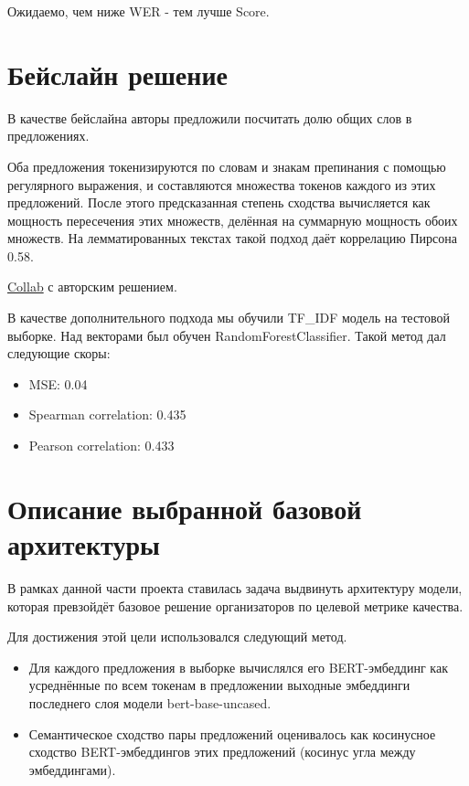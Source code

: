 \documentclass[12pt]{article}
\begin{document}
Ожидаемо, чем ниже WER - тем лучше Score.
\newpage

\section{Бейслайн решение}

В качестве бейслайна авторы предложили посчитать долю общих слов в предложениях.

Оба предложения токенизируются по словам и знакам препинания с помощью регулярного выражения, и составляются множества токенов каждого из этих предложений. После этого предсказанная степень сходства вычисляется как мощность пересечения этих множеств, делённая на суммарную мощность обоих множеств.
На лемматированных текстах такой подход даёт коррелацию Пирсона 0.58.

\href{https://github.com/semantic-textual-relatedness/Semantic_Relatedness_SemEval2024/blob/main/STR_Baseline.ipynb}{Collab} с авторским решением.

В качестве дополнительного подхода мы обучили TF\_IDF модель на тестовой выборке. Над векторами был обучен RandomForestClassifier. Такой метод дал следующие скоры:
\begin{itemize}
    \item MSE: 0.04
    \item Spearman correlation: 0.435
    \item Pearson correlation: 0.433
\end{itemize}

\section{Описание выбранной базовой архитектуры}
В рамках данной части проекта ставилась задача выдвинуть архитектуру модели, которая превзойдёт базовое решение организаторов по целевой метрике качества.

Для достижения этой цели использовался следующий метод.
\begin{itemize}
    \item Для каждого предложения в выборке вычислялся его BERT-эмбеддинг как \\ усреднённые по всем токенам в предложении выходные эмбеддинги последнего слоя модели bert-base-uncased.

    \item Семантическое сходство пары предложений оценивалось как косинусное сходство BERT-эмбеддингов этих предложений (косинус угла между эмбеддингами).
\end{itemize}
\end{document}
